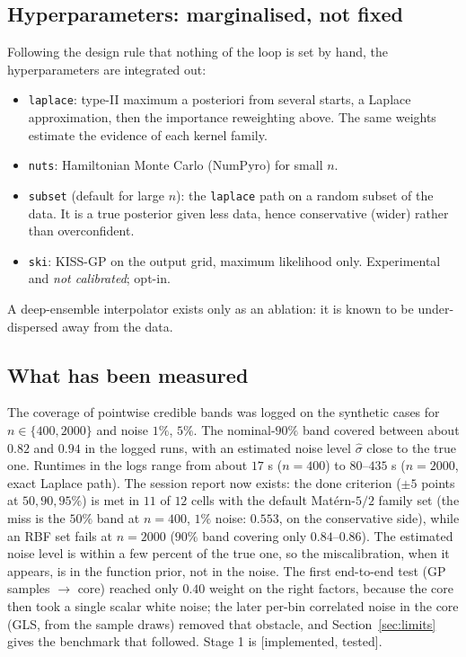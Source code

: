 \documentclass[11pt,a4paper]{article}
\theoremstyle{definition}
\newcommand{\badge}[2]{\textcolor{#1}{\textsf{\footnotesize[#2]}}}
\newcommand{\impl}{\badge{cC}{implemented, tested}}
\begin{document}
\subsection{Hyperparameters: marginalised, not fixed}
Following the design rule that nothing of the loop is set by hand, the hyperparameters are integrated out:
\begin{itemize}[nosep]
\item \texttt{laplace}: type-II maximum a posteriori from several starts, a Laplace approximation, then the importance reweighting above. The same weights estimate the evidence of each kernel family.
\item \texttt{nuts}: Hamiltonian Monte Carlo (NumPyro) for small $n$.
\item \texttt{subset} (default for large $n$): the \texttt{laplace} path on a random subset of the data. It is a true posterior given less data, hence conservative (wider) rather than overconfident.
\item \texttt{ski}: KISS-GP on the output grid, maximum likelihood only. Experimental and \emph{not calibrated}; opt-in.
\end{itemize}
A deep-ensemble interpolator exists only as an ablation: it is known to be under-dispersed away from the data.

\subsection{What has been measured}
The coverage of pointwise credible bands was logged on the synthetic cases for $n\in\{400,2000\}$ and noise $1\%$, $5\%$. The nominal-$90\%$ band covered between about $0.82$ and $0.94$ in the logged runs, with an estimated noise level $\hat\sigma$ close to the true one. Runtimes in the logs range from about $17$ s ($n=400$) to $80$--$435$ s ($n=2000$, exact Laplace path). The session report now exists: the done criterion ($\pm5$ points at $50,90,95\%$) is met in $11$ of $12$ cells with the default Mat\'ern-$5/2$ family set (the miss is the $50\%$ band at $n=400$, $1\%$ noise: $0.553$, on the conservative side), while an RBF set fails at $n=2000$ ($90\%$ band covering only $0.84$--$0.86$). The estimated noise level is within a few percent of the true one, so the miscalibration, when it appears, is in the function prior, not in the noise. The first end-to-end test (GP samples $\to$ core) reached only $0.40$ weight on the right factors, because the core then took a single scalar white noise; the later per-bin correlated noise in the core (GLS, from the sample draws) removed that obstacle, and Section~\ref{sec:limits} gives the benchmark that followed. Stage 1 is \impl{}.
\end{document}
